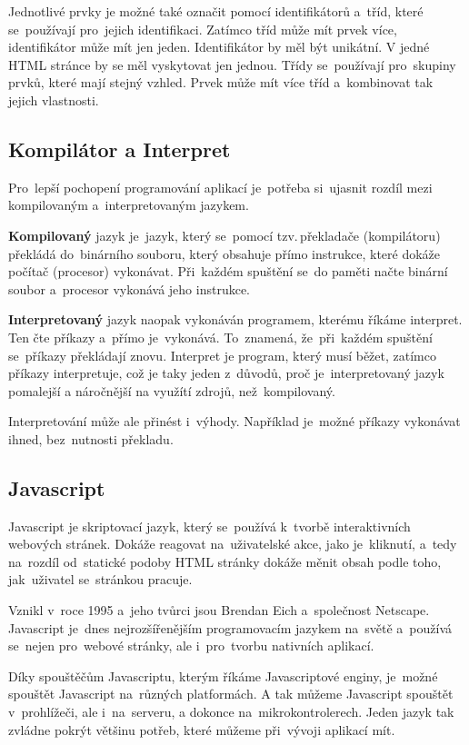 \documentclass[14pt,a4paper]{article}
\begin{document}
        Jednotlivé prvky je možné také označit pomocí identifikátorů a~tříd, které se~používají pro~jejich identifikaci.
        Zatímco tříd může mít prvek více, identifikátor může mít jen jeden. Identifikátor by měl být unikátní. V jedné HTML stránce by se měl vyskytovat jen jednou.
        Třídy se~používají pro~skupiny prvků, které mají stejný vzhled. Prvek může mít více tříd a~kombinovat tak jejich vlastnosti.

        \subsection{Kompilátor a Interpret}
        Pro~lepší pochopení programování aplikací je~potřeba si~ujasnit rozdíl mezi kompilovaným a~interpretovaným jazykem.

        \textbf{Kompilovaný} jazyk je~jazyk, který se~pomocí tzv.\,překladače (kompilátoru) překládá do~binárního souboru, který obsahuje přímo instrukce,
        které dokáže počítač (procesor) vykonávat. Při~každém spuštění se~do paměti načte binární soubor a~procesor vykonává jeho instrukce.

        \textbf{Interpretovaný} jazyk naopak vykonáván programem, kterému říkáme interpret. Ten čte příkazy a~přímo je~vykonává. To~znamená,
        že~při~každém spuštění se~příkazy překládají znovu. Interpret je program, který musí běžet, zatímco příkazy interpretuje,
        což je taky jeden z~důvodů, proč je~interpretovaný jazyk pomalejší a náročnější na využítí zdrojů, než~kompilovaný.
        
        Interpretování může ale přinést i~výhody. Například je~možné příkazy vykonávat ihned, bez~nutnosti překladu.
        
        \subsection{Javascript}
        Javascript je skriptovací jazyk, který se~používá k~tvorbě interaktivních webových stránek. Dokáže reagovat na~uživatelské akce,
        jako je~kliknutí, a~tedy na~rozdíl od~statické podoby HTML stránky dokáže měnit obsah podle toho, jak~uživatel se~stránkou pracuje.

        Vznikl v~roce 1995 a~jeho tvůrci jsou Brendan Eich a~společnost Netscape.
        Javascript je~dnes nejrozšířenějším programovacím jazykem na~světě a~používá se~nejen pro~webové stránky,
        ale i~pro~tvorbu nativních aplikací.

        Díky spouštěčům Javascriptu, kterým říkáme Javascriptové enginy, je~možné spouštět Javascript na~různých platformách.
        A tak můžeme Javascript spouštět v~prohlížeči, ale i~na~serveru, a dokonce na~mikrokontrolerech. Jeden jazyk tak zvládne pokrýt
        většinu potřeb, které můžeme při~vývoji aplikací mít.
\end{document}

